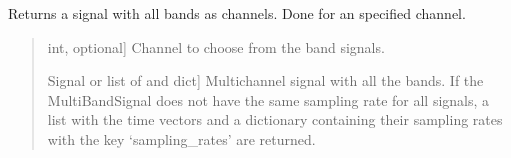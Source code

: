 \documentclass[letterpaper,10pt,english]{sphinxmanual}
\begin{document}
\begin{fulllineitems}
\begin{fulllineitems}
\label{\detokenize{classes:dsptools.classes.multibandsignal.MultiBandSignal.get_all_bands}}
\pysigstartsignatures
{}
\pysigstopsignatures
\sphinxAtStartPar
Returns a signal with all bands as channels. Done for an specified
channel.
\begin{quote}\begin{description}
\begin{description}
\sphinxlineitem{\sphinxstylestrong{channel}}{[}int, optional{]}
\sphinxAtStartPar
Channel to choose from the band signals.

\end{description}

\begin{description}
\sphinxlineitem{\sphinxstylestrong{sig}}{[}Signal or list of  and dict{]}
\sphinxAtStartPar
Multichannel signal with all the bands. If the MultiBandSignal
does not have the same sampling rate for all signals, a list with
the time vectors and a dictionary containing their sampling rates
with the key ‘sampling\_rates’ are returned.

\end{description}

\end{description}\end{quote}

\end{fulllineitems}



\end{fulllineitems}
\end{document}
